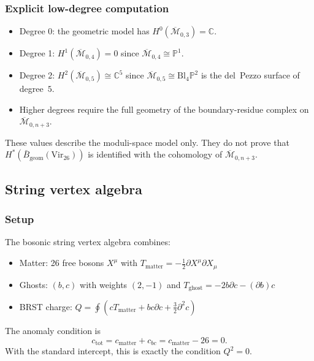 \subsubsection{Explicit low-degree computation}

\begin{example}
\begin{itemize}
\item Degree 0: the geometric model has $H^0(\overline{\mathcal{M}}_{0,3}) = \mathbb{C}$.
\item Degree 1: $H^1(\overline{\mathcal{M}}_{0,4}) = 0$ since $\overline{\mathcal{M}}_{0,4} \cong \mathbb{P}^1$.
\item Degree 2: $H^2(\overline{\mathcal{M}}_{0,5}) \cong \mathbb{C}^5$ since $\overline{\mathcal{M}}_{0,5} \cong \mathrm{Bl}_4\mathbb{P}^2$ is the del~Pezzo surface of degree~$5$.
\item Higher degrees require the full geometry of the boundary-residue complex on $\overline{\mathcal{M}}_{0,n+3}$.
\end{itemize}
These values describe the moduli-space model only. They do not prove
that
$H^*(\bar{B}_{\mathrm{geom}}(\mathrm{Vir}_{26}))$ is identified with
the cohomology of $\overline{\mathcal{M}}_{0,n+3}$.
\end{example}


\subsection{String vertex algebra}

\subsubsection{Setup}

\begin{definition}
The bosonic string vertex algebra combines:
\begin{itemize}
\item Matter: 26 free bosons $X^\mu$ with $T_{\text{matter}} = -\frac{1}{2}\partial X^\mu \partial X_\mu$
\item Ghosts: $(b,c)$ with weights $(2,-1)$ and $T_{\text{ghost}} = -2b\partial c - (\partial b)c$
\item BRST charge: $Q = \oint \left(c T_{\text{matter}} + bc\partial c + \frac{3}{2}\partial^2 c\right)$
\end{itemize}
The anomaly condition is
\[
c_{\mathrm{tot}}=c_{\mathrm{matter}}+c_{bc}=c_{\mathrm{matter}}-26=0.
\]
With the standard intercept, this is exactly the condition
$Q^2=0$.
\end{definition}



